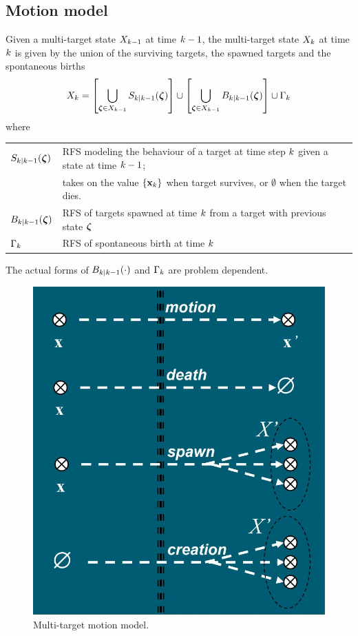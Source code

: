 \documentclass[a4paper,10pt]{scrreprt}
\theoremstyle{theorem}
\theoremstyle{definition}
\begin{document}
\subsection{Motion model}
Given a multi-target state \( X_{k-1} \) at time \( k-1 \), the multi-target state \( X_k \) at time \( k \) is given by the union of the surviving targets, the spawned targets and the spontaneous births
\begin{equation}\label{eq:multitarget_dynamics}
	\stRFS_\tind = \bqty{ \bigcup_{\vb{\zeta} \in \stRFS_{\tind-1}} S_{\tind|\tind-1}(\vb{\zeta}) } \cup \bqty{ \bigcup_{\vb{\zeta} \in \stRFS_{\tind-1}} B_{\tind|\tind-1}(\vb{\zeta}) } \cup \Gamma_\tind
\end{equation}
where
\begin{table}[h]
\centering
\begin{tabular}{@{} l l @{}}
	\toprule
	\( S_{\tind|\tind-1}(\vb{\zeta}) \)		& RFS modeling the behaviour of a target at time step \( k \) given a state at time \( k-1 \); \\
											& takes on the value \( \Bqty{\inVar_\tind} \) when target survives, or \( \emptyset \) when the target dies. \\
	\( B_{\tind|\tind-1}(\vb{\zeta}) \)		& RFS of targets spawned at time \( k \) from a target with previous state \( \vb{\zeta} \) \\
	\( \Gamma_k \)						& RFS of spontaneous birth at time \( k \) \\
	\bottomrule
\end{tabular}
\end{table}
The actual forms of \( B_{k|k-1}(\cdot) \) and \( \Gamma_k \) are problem dependent.
\begin{figure}[h]
	\centering
	\includegraphics[scale=0.2]{./img/multi-target_motion_model}
	\caption{Multi-target motion model.}
\end{figure}
\end{document}
